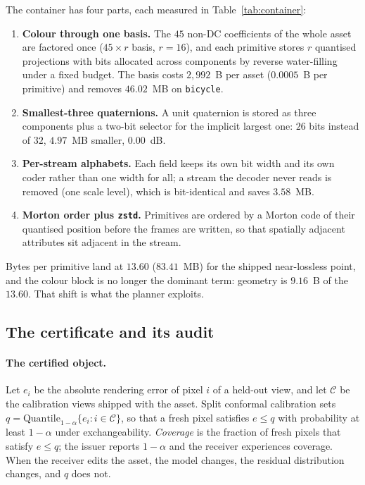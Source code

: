 \documentclass[preprint,number,3p]{elsarticle}
\begin{document}
The container has four parts, each measured in Table~\ref{tab:container}:
\begin{enumerate}
  \item \textbf{Colour through one basis.} The $45$ non-DC coefficients of the whole asset are factored once
  ($45 \times r$ basis, $r = 16$), and each primitive stores $r$ quantised projections with bits allocated across
  components by reverse water-filling under a fixed budget. The basis costs $2{,}992$~B per asset
  ($0.0005$~B per primitive) and removes $46.02$~MB on \texttt{bicycle}.
  \item \textbf{Smallest-three quaternions.} A unit quaternion is stored as three components plus a two-bit selector
  for the implicit largest one: $26$ bits instead of $32$, $4.97$~MB smaller, $0.00$~dB.
  \item \textbf{Per-stream alphabets.} Each field keeps its own bit width and its own coder rather than one width for
  all; a stream the decoder never reads is removed (one scale level), which is bit-identical and saves $3.58$~MB.
  \item \textbf{Morton order plus \texttt{zstd}.} Primitives are ordered by a Morton code of their quantised position
  before the frames are written, so that spatially adjacent attributes sit adjacent in the stream.
\end{enumerate}

Bytes per primitive land at $13.60$ ($83.41$~MB) for the shipped near-lossless point, and the colour block is no
longer the dominant term: geometry is $9.16$~B of the $13.60$. That shift is what the planner exploits.

\subsection{The certificate and its audit}
\label{sec:cert}

\paragraph{The certified object.} Let $e_i$ be the absolute rendering error of pixel $i$ of a held-out view, and let
$\mathcal{C}$ be the calibration views shipped with the asset. Split conformal calibration \cite{vovk2005} sets
$q = \mathrm{Quantile}_{1-\alpha}\{e_i : i \in \mathcal{C}\}$, so that a fresh pixel satisfies $e \le q$ with
probability at least $1-\alpha$ under exchangeability. \emph{Coverage} is the fraction of fresh pixels that satisfy
$e \le q$; the issuer reports $1-\alpha$ and the receiver experiences coverage. When the receiver edits the asset, the
model changes, the residual distribution changes, and $q$ does not.
\end{document}
